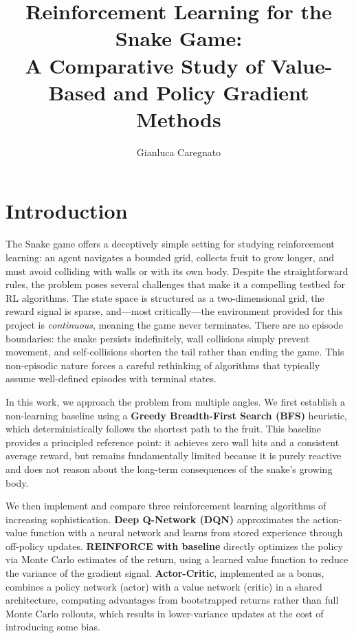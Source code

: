 \documentclass[11pt, a4paper]{article}
\title{\textbf{Reinforcement Learning for the Snake Game:\\A Comparative Study of Value-Based and Policy Gradient Methods}}
\author{Gianluca Caregnato}
\date{}
\begin{document}
\maketitle

\section{Introduction}

The Snake game offers a deceptively simple setting for studying reinforcement learning: an agent
navigates a bounded grid, collects fruit to grow longer, and must avoid colliding with walls or
with its own body. Despite the straightforward rules, the problem poses several challenges that
make it a compelling testbed for RL algorithms. The state space is structured as a two-dimensional
grid, the reward signal is sparse, and---most critically---the environment provided for this project
is \emph{continuous}, meaning the game never terminates. There are no episode boundaries: the
snake persists indefinitely, wall collisions simply prevent movement, and self-collisions shorten
the tail rather than ending the game. This non-episodic nature forces a careful rethinking of
algorithms that typically assume well-defined episodes with terminal states.

In this work, we approach the problem from multiple angles. We first establish a
non-learning baseline using a \textbf{Greedy Breadth-First Search (BFS)} heuristic, which
deterministically follows the shortest path to the fruit. This baseline provides a principled
reference point: it achieves zero wall hits and a consistent average reward, but remains
fundamentally limited because it is purely reactive and does not reason about the long-term
consequences of the snake's growing body.

We then implement and compare three reinforcement learning algorithms of increasing
sophistication. \textbf{Deep Q-Network (DQN)} approximates the action-value function with a
neural network and learns from stored experience through off-policy updates.
\textbf{REINFORCE with baseline} directly optimizes the policy via Monte Carlo estimates of the
return, using a learned value function to reduce the variance of the gradient signal.
\textbf{Actor-Critic}, implemented as a bonus, combines a policy network (actor) with a value
network (critic) in a shared architecture, computing advantages from bootstrapped returns rather
than full Monte Carlo rollouts, which results in lower-variance updates at the cost of introducing
some bias.
\end{document}
